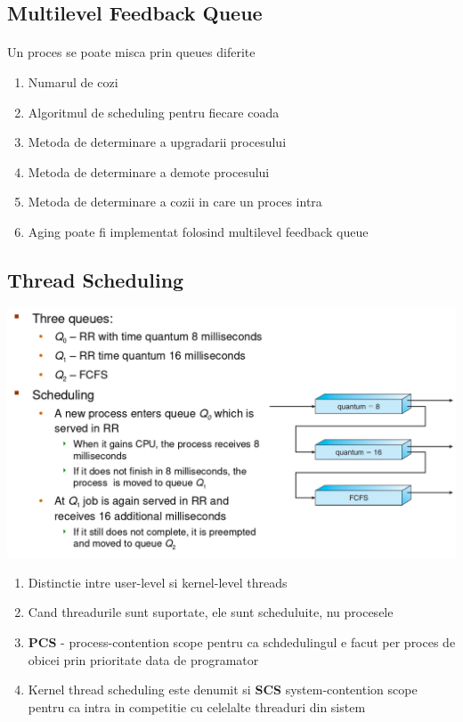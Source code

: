 \documentclass{article}
\begin{document}
\subsection*{Multilevel Feedback Queue}
\paragraph*{}Un proces se poate misca prin queues diferite
\begin{enumerate}
    \item Numarul de cozi
    \item Algoritmul de scheduling pentru fiecare coada
    \item Metoda de determinare a upgradarii procesului
    \item Metoda de determinare a demote procesului
    \item Metoda de determinare a cozii in care un proces intra
    \item Aging poate fi implementat folosind multilevel feedback queue
\end{enumerate}

\subsection*{Thread Scheduling}

\begin{center}
    \includegraphics[scale=0.3]{13_exmq.png}
\end{center}

\begin{enumerate}
    \item Distinctie intre user-level si kernel-level threads
    \item Cand threadurile sunt suportate, ele sunt scheduluite, nu procesele
    \item \textbf{PCS} - process-contention scope pentru ca schdedulingul e facut per proces de obicei prin prioritate data de programator
    \item Kernel thread scheduling este denumit si \textbf{SCS} system-contention scope pentru ca intra in competitie cu celelalte threaduri din sistem
\end{enumerate}
\end{document}
